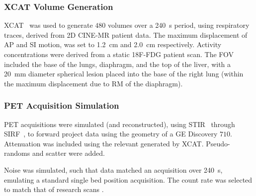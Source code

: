             \subsubsection{XCAT Volume Generation} \label{sec:xcat_volume_generation}
                \gls{XCAT}~\parencite{Segars2010} was used to generate $480$ volumes over a \SI{240}{\second} period, using respiratory traces, derived from \gls{2D} CINE-\gls{MR} patient data. The maximum displacement of \gls{AP} and \gls{SI} motion, was set to \SI{1.2}{\centi\metre} and \SI{2.0}{\centi\metre} respectively. Activity concentrations were derived from a static \gls{18F-FDG} patient scan. The \gls{FOV} included the base of the lungs, diaphragm, and the top of the liver, with a \SI{20}{\milli\metre} diameter spherical lesion %
                placed into the base of the right lung (within the maximum displacement due to \gls{RM} of the diaphragm).
            
            
            \subsubsection{PET Acquisition Simulation} \label{sec:pet_ct_motion_correction_exploiting_motion_models_fit_on_coarsely_gated_data_applied_to_finely_gated_data_methods_pet_acquisition_simulation}
                \gls{PET} acquisitions were simulated (and reconstructed), using \gls{STIR}~\parencite{Thielemans2012, Nikos2019} through \gls{SIRF}~\parencite{Ovtchinnikov2017}, to forward project data using the geometry of a \gls{GE} Discovery $710$. Attenuation was included using the relevant  generated by \gls{XCAT}. Pseudo-randoms and scatter were added.%
                
                Noise was simulated, such that data matched an acquisition over \SI{240}{\second}, emulating a standard single bed position acquisition. The count rate was selected to match that of research scans%
                .
                
